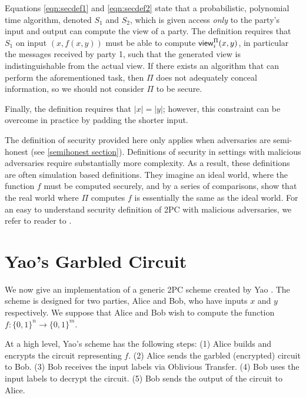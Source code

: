 \begin{description}
Equations \ref{eqn:secdef1} and \ref{eqn:secdef2} state that a probabilistic, polynomial time algorithm, denoted $S_1$ and $S_2$, which is given access \textit{only} to the party's input and output can compute the view of a party.
The definition requires that $S_1$ on input $(x, f(x,y))$ must be able to compute ${\sf view}^{\Pi}_i(x,y)$, in particular the messages received by party 1, such that the generated view is indistinguishable from the actual view.
If there exists an algorithm that can perform the aforementioned task, then $\Pi$ does not adequately conceal information, so we should not consider $\Pi$ to be secure.

Finally, the definition requires that $|x| = |y|$; however, this constraint can be overcome in practice by padding the shorter input.
\end{description}

The definition of security provided here only applies when adversaries are semi-honest (see \ref{semihonest section}).
Definitions of security in settings with malicious adversaries require substantially more complexity.
As a result, these definitions are often simulation based definitions.
They imagine an ideal world, where the function $f$ must be computed securely, and by a series of comparisons, show that the real world where $\Pi$ computes $f$ is essentially the same as the ideal world.
For an easy to understand security definition of 2PC with malicious adversaries, we refer to reader to \cite{lindell2009}.

\section{Yao's Garbled Circuit}
We now give an implementation of a generic 2PC scheme created by Yao \cite{yao}.
The scheme is designed for two parties, Alice and Bob, who have inputs $x$ and $y$ respectively.
We suppose that Alice and Bob wish to compute the function $f : \{0,1\}^n \to \{0,1\}^m$. 

At a high level, Yao's scheme has the following steps: (1) Alice builds and encrypts the circuit representing $f$. (2) Alice sends the garbled (encrypted) circuit to Bob. (3) Bob receives the input labels via Oblivious Transfer. (4) Bob uses the input labels to decrypt the circuit. (5) Bob sends the output of the circuit to Alice.

